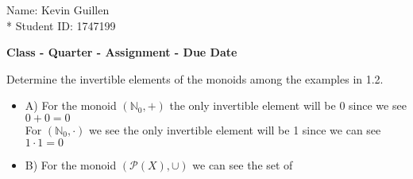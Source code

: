 \documentclass[12pt]{article}
\newcommand      {\Nm}         {{\mathbb N}}
\begin{document}
\begin{flushright}
    Name: Kevin Guillen \\*
    Student ID: 1747199
\end{flushright}
\begin{center}
    {\bf Class - Quarter - Assignment - Due Date}
\end{center}

 Determine the invertible elements of the monoids among the examples in 1.2.
\begin{itemize}
    \item{A)} For the monoid $(\Nm_0, +)$ the only invertible element will be 0 since we see $0 + 0 = 0$
    \\ For $(\Nm_0, \cdot)$ we see the only invertible element will be 1 since we can see $1 \cdot 1 = 0$

    \item{B)} For the monoid $(\mathcal{P}(X), \cup)$ we can see the set of 
\end{itemize}
\end{document}
